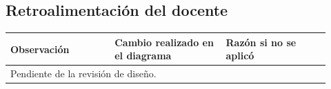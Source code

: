 \subsection{Retroalimentación del docente}
\begin{longtable}{@{}p{0.30\linewidth}p{0.32\linewidth}p{0.30\linewidth}@{}}
\toprule
Observación & Cambio realizado en el diagrama & Razón si no se aplicó \\
\midrule\endhead
\multicolumn{3}{l}{Pendiente de la revisión de diseño.}\\
\bottomrule
\end{longtable}
